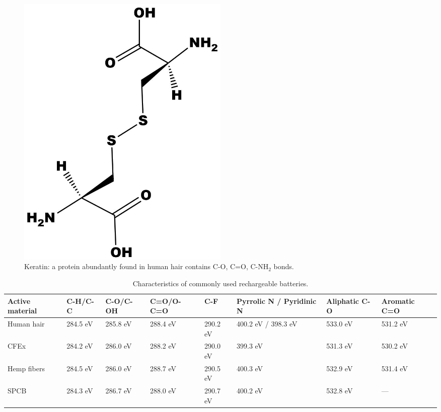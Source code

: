 \begin{figure}[h!]
\centering
\includegraphics[width=0.5\textwidth]{Figures/chap5fig/keratin}
\caption{Keratin: a protein abundantly found in human hair contains C-O, C=O, C-NH$_2$ bonds.}
\label{Figures/chap5fig:keratin}
\end{figure}

\begin{table}
\centering
\caption{Characteristics of commonly used rechargeable batteries.} \label{table2xps}
\begin{tabular}{ |p{2.5cm}|p{2cm}|p{2cm}|p{2cm}|p{1.5cm}|p{2.5cm}|p{2.5cm}|p{2.5cm}|}
\hline
\textbf{Active material} & \textbf{C-H/C-C} & \textbf{C-O/C-OH} & \textbf{C=O/O-C=O} & \textbf{C-F} & \textbf{Pyrrolic N / Pyridinic N} & \textbf{Aliphatic C-O} & \textbf{Aromatic C=O}\\
\hline
Human hair & 284.5 eV & 285.8 eV & 288.4 eV & 290.2 eV & 400.2 eV / 398.3 eV & 533.0 eV & 531.2 eV\\
CFEx & 284.2 eV & 286.0 eV & 288.2 eV & 290.0 eV & 399.3 eV & 531.3 eV & 530.2 eV\\
Hemp fibers & 284.5 eV & 286.0 eV & 288.7 eV & 290.5 eV & 400.3 eV & 532.9 eV & 531.4 eV\\
SPCB & 284.3 eV & 286.7 eV & 288.0 eV & 290.7 eV & 400.2 eV & 532.8 eV & ---\\
\hline
\end{tabular}
\end{table}

\newpage

